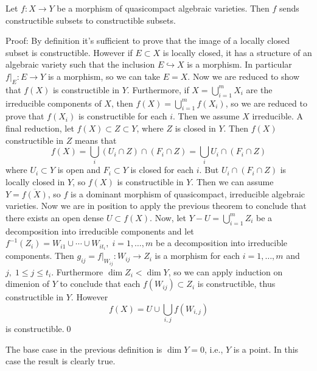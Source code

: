 \begin{dang}
    \begin{proposition}
        Let $f:X\to Y$ be a morphism of quasicompact algebraic varieties. Then $f$ 
        sends constructible subsets to constructible subsets.
    \end{proposition}
\end{dang}
Proof: By definition it's sufficient to prove that the image of a locally closed subset is constructible. However 
if $E\subset X$ is locally closed, it has a structure of an algebraic variety such that the inclusion $E\hookrightarrow X$
is a morphism. In particular $f|_E:E\to Y$ is a morphism, so we can take $E=X$. Now we are reduced to show that 
$f(X)$ is constructible in $Y$. Furthermore, if $X=\bigcup_{i=1}^m X_i$ are the irreducible components of $X$, then 
$f(X)=\bigcup_{i=1}^m f(X_i)$, so we are reduced to prove that $f(X_i)$ is constructible for each $i$. Then we 
assume $X$ irreducible. A final reduction, let $f(X)\subset Z\subset Y$, where $Z$ is closed in $Y$. Then 
$f(X)$ constructible in $Z$ means that 
\begin{equation}
    f(X)=\bigcup_i (U_i\cap Z)\cap (F_i\cap Z) = \bigcup_i U_i\cap (F_i\cap Z) 
\end{equation}  
where $U_i\subset Y$ is open and $F_i\subset Y$ is closed for each $i$. But $U_i\cap (F_i\cap Z)$ is locally 
closed in $Y$, so $f(X)$ is constructible in $Y$. Then we can assume $Y=\overline{f(X)}$, so $f$ is a dominant 
morphism of quasicompact, irreducible algebraic varieties. Now we are in position to 
apply the previous theorem to conclude that there exists an open dense $U\subset f(X)$. Now, let 
$Y- U = \bigcup_{i=1}^m Z_i$ be a decomposition into irreducible components and let 
$f^{-1}(Z_i)= W_{i1}\cup\cdots\cup W_{i t_i},\;i=1,\dots, m$ be a decomposition into irreducible components. 
Then $g_{ij}=f|_{W_{ij}}:W_{ij}\to Z_i$ is a morphism for each $i=1,\dots,m$ and $j,\;1\leq j\leq t_i$. Furthermore 
$\dim Z_i < \dim Y$, so we can apply induction on dimenion of $Y$ to conclude that each $f(W_{ij})\subset Z_i$ 
is constructible, thus constructible in $Y$. However 
\begin{equation}
    f(X) = U \cup \bigcup_{i,j}f(W_{i,j}) 
\end{equation}
is constructible.\qed

\begin{remark}
    The base case in the previous definition is $\dim Y=0$, i.e., $Y$ is a point. In this case the result is 
    clearly true.
\end{remark}

